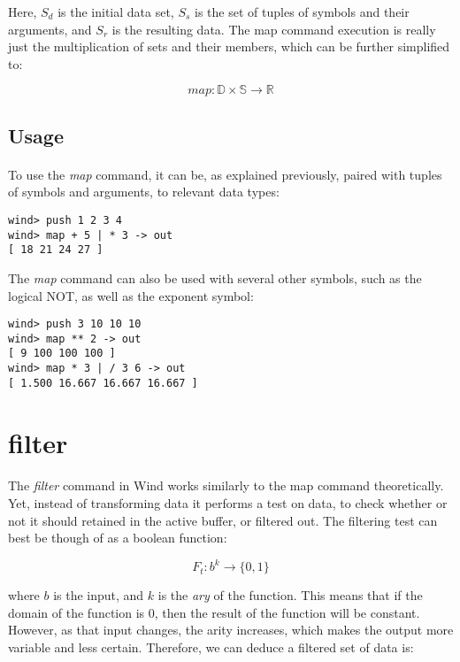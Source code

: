 Here, $S_d$ is the initial data set, $S_s$ is the set of tuples of symbols and their arguments, and $S_r$ is the resulting data. The map command execution is really just the multiplication of sets and their members, which can be further simplified to:

$$
map : \mathbb{D} \times \mathbb{S} \longrightarrow \mathbb{R}
$$

\subsection{Usage}

\paragraph{  } To use the \emph{map} command, it can be, as explained previously, paired with tuples of symbols and arguments, to relevant data types:

\begin{verbatim}
wind> push 1 2 3 4
wind> map + 5 | * 3 -> out
[ 18 21 24 27 ]
\end{verbatim}

\par The \emph{map} command can also be used with several other symbols, such as the logical NOT, as well as the exponent symbol:

\begin{verbatim}
wind> push 3 10 10 10       
wind> map ** 2 -> out
[ 9 100 100 100 ]
wind> map * 3 | / 3 6 -> out
[ 1.500 16.667 16.667 16.667 ]
\end{verbatim}

\section{filter}

\paragraph{ } The \emph{filter} command in Wind works similarly to the map command theoretically. Yet, instead of transforming data it performs a test on data, to check whether or not it should retained in the active buffer, or filtered out. The filtering test can best be though of as a boolean function:

$$
F_t: b^k \longrightarrow \{0, 1\}
$$

where $b$ is the input, and $k$ is the \emph{ary} of the function. This means that if the domain of the function is 0, then the result of the function will be constant. However, as that input changes, the arity increases, which makes the output more variable and less certain. Therefore, we can deduce a filtered set of data is:

